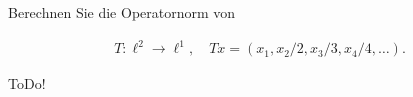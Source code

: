 
\begin{exercise}

Berechnen Sie die Operatornorm von

\begin{align*}
    T: \ell^2 \to \ell^1,
    \quad
    Tx = (x_1, x_2 / 2, x_3 / 3, x_4 / 4, \ldots).
\end{align*}

\end{exercise}


\begin{solution}

ToDo!

\end{solution}

